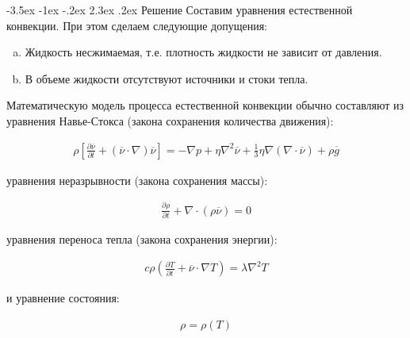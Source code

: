 \documentclass[14pt, a4paper]{article}
\makeatletter
\renewcommand\section{\@startsection {section}{1}{1.25cm}%
                                   {-3.5ex \@plus -1ex \@minus -.2ex}%
                                   {2.3ex \@plus.2ex}%
                                   {\normalfont\fontsize{15}{15}\bfseries}}
\renewcommand\large{\fontsize{15}{10}\selectfont}
\makeatother
\begin{document}
\renewcommand{\figurename}{Рисунок}
\renewcommand\contentsname{\large{ОГЛАВЛЕНИЕ}}
\renewcommand\refname{\centering СПИСОК ИСПОЛЬЗОВАННЫХ ИСТОЧНИКОВ}
\renewcommand\refname{\centering СПИСОК ЛИТЕРАТУРЫ}

\section{Решение}
Составим уравнения естественной конвекции. При этом сделаем следующие допущения: 

\begin{enumerate}[(a)]
\item Жидкость несжимаемая, т.е. плотность жидкости не зависит от давления.
\item В объеме жидкости отсутствуют источники и стоки тепла.
\end{enumerate}

Математическую модель процесса естественной конвекции обычно составляют из уравнения Навье-Стокса (закона сохранения количества движения):

\begin{equation}
\begin{gathered}
\label{f1}
\rho[\frac{\partial \overline \nu}{\partial t} + (\overline \nu \cdot \nabla)\overline \nu]=-\nabla p + \eta \nabla^2 \overline \nu + \frac{1}{3} \eta \nabla (\nabla \cdot \overline \nu) + \rho \overline g
\end{gathered}
\end{equation}

уравнения неразрывности (закона сохранения массы):

\begin{equation}
\begin{gathered}
\label{f2}
\frac{\partial \rho}{\partial t} + \nabla \cdot (\rho \overline \nu) = 0
\end{gathered}
\end{equation}

уравнения переноса тепла (закона сохранения энергии):

\begin{equation}
\begin{gathered}
\label{f3}
c \rho(\frac{\partial T}{\partial t} + \overline \nu \cdot \nabla T) = \lambda \nabla^2 T
\end{gathered}
\end{equation}

и уравнение состояния:

\begin{equation}
\begin{gathered}
\label{f4}
\rho = \rho (T)
\end{gathered}
\end{equation}
\end{document}
